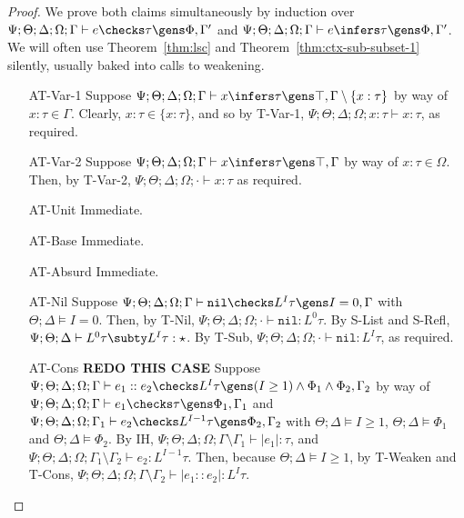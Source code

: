 \begin{proof}
We prove both claims simultaneously by induction over $\Psi;\Theta;\Delta;\Omega;\Gamma \vdash e \checks \tau \gens \Phi, \Gamma'$ and $\Psi;\Theta;\Delta;\Omega;\Gamma \vdash e \infers \tau \gens \Phi, \Gamma'$.
We will often use Theorem~\ref{thm:lsc} and Theorem~\ref{thm:ctx-sub-subset-1} silently, usually baked into calls to weakening.
\begin{enumerate}
  \item[AT-Var-1] Suppose $\Psi ; \Theta ; \Delta ; \Omega ; \Gamma\vdash x \infers \tau \gens \top, \Gamma \setminus \{x : \tau\}$ by way of $x : \tau \in \Gamma$. Clearly, $x : \tau \in \{x : \tau\}$, and so by T-Var-1, $\Psi ; \Theta ; \Delta ; \Omega ; x : \tau \vdash x : \tau$, as required.
  \item[AT-Var-2] Suppose $\Psi ; \Theta ; \Delta ; \Omega ; \Gamma\vdash x \infers \tau \gens \top, \Gamma$ by way of $x : \tau \in \Omega$. Then, by T-Var-2, $\Psi ; \Theta ; \Delta ; \Omega ; \cdot \vdash x : \tau$ as required.
  
  \item[AT-Unit] Immediate. 
  \item[AT-Base] Immediate. 
  \item[AT-Absurd] Immediate. 
  \item[AT-Nil] Suppose $\Psi ; \Theta ; \Delta ; \Omega ; \Gamma\vdash \texttt{nil} \checks L^I \tau \gens I = 0, \Gamma$  with $\Theta ; \Delta \vDash I = 0$. Then, by T-Nil, $\Psi ; \Theta ; \Delta ; \Omega ; \cdot \vdash \texttt{nil} : L^0 \tau$. By S-List and S-Refl, $\Psi ; \Theta ; \Delta \vdash L^0 \tau \subty L^I \tau : \star$. By T-Sub, $\Psi ; \Theta ; \Delta ; \Omega ; \cdot \vdash \texttt{nil} : L^I \tau$, as required.
 
  
  \item[AT-Cons] 
  \textbf{REDO THIS CASE}  
  Suppose $\Psi ; \Theta ; \Delta ; \Omega ; \Gamma\vdash e_1 :: e_2 \checks L^I \tau \gens (I \geq 1) \wedge \Phi_1 \wedge \Phi_2, \Gamma_2$ by way of $\Psi ; \Theta ; \Delta ; \Omega ; \Gamma\vdash e_1 \checks \tau \gens \Phi_1, \Gamma_1$ and $\Psi ; \Theta ; \Delta ; \Omega ; \Gamma_1\vdash e_2 \checks L^{I-1} \tau \gens \Phi_2, \Gamma_2$ with $\Theta ; \Delta \vDash I \geq 1$, $\Theta ; \Delta \vDash \Phi_1$ and $\Theta ; \Delta \vDash \Phi_2$. By IH, $\Psi ; \Theta ; \Delta ; \Omega ; \Gamma \setminus \Gamma_1 \vdash |e_1| : \tau$, and $\Psi ; \Theta ; \Delta ; \Omega ; \Gamma_1 \setminus \Gamma_2 \vdash e_2 : L^{I-1} \tau$. Then, because $\Theta ; \Delta \vDash I \geq 1$, by T-Weaken and T-Cons, $\Psi ; \Theta ; \Delta ; \Omega ; \Gamma \setminus \Gamma_2 \vdash |e_1 :: e_2| : L^I \tau$.
  

\end{enumerate}
\end{proof}
